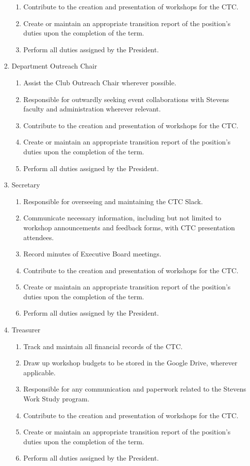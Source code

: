 \documentclass[a4paper,12pt]{article}
\begin{document}
\begin{enumerate}
\begin{enumerate}
	\item Contribute to the creation and presentation of workshops for the CTC.
	\item Create or maintain an appropriate transition report of the position's duties upon the completion of the term.
	\item Perform all duties assigned by the President.
	\end{enumerate}
\item Department Outreach Chair
	\begin{enumerate}
	\item Assist the Club Outreach Chair wherever possible.
	\item Responsible for outwardly seeking event collaborations with Stevens faculty and administration wherever relevant.
	\item Contribute to the creation and presentation of workshops for the CTC.
	\item Create or maintain an appropriate transition report of the position's duties upon the completion of the term.
	\item Perform all duties assigned by the President.
	\end{enumerate}
\item Secretary
	\begin{enumerate}
	\item Responsible for overseeing and maintaining the CTC Slack.
	\item Communicate necessary information, including but not limited to workshop announcements and feedback forms, with CTC presentation attendees.
	\item Record minutes of Executive Board meetings.
	\item Contribute to the creation and presentation of workshops for the CTC.
	\item Create or maintain an appropriate transition report of the position's duties upon the completion of the term.
	\item Perform all duties assigned by the President.
	\end{enumerate}
\item Treasurer
	\begin{enumerate}
	\item Track and maintain all financial records of the CTC.
	\item Draw up workshop budgets to be stored in the Google Drive, wherever applicable.
	\item Responsible for any communication and paperwork related to the Stevens Work Study program.
	\item Contribute to the creation and presentation of workshops for the CTC.
	\item Create or maintain an appropriate transition report of the position's duties upon the completion of the term.
	\item Perform all duties assigned by the President.
	\end{enumerate}
\end{enumerate}
\end{document}
